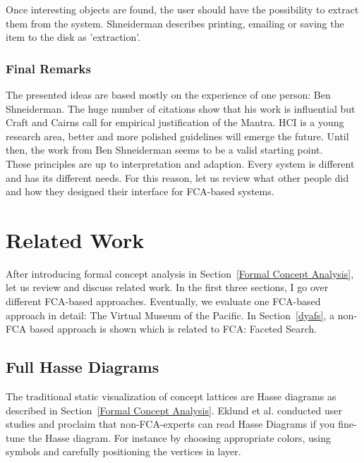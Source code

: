\documentclass[11pt]{report}
\begin{document}
Once interesting objects are found, the user should have the possibility to extract them from the system. Shneiderman describes printing, emailing or saving the item to the disk as 'extraction'.

\subsection{Final Remarks}

The presented ideas are based mostly on the experience of one person: Ben Shneiderman. The huge number of citations show that his work is influential but Craft and Cairns \cite{Craft2005} call for empirical justification of the Mantra. HCI is a young research area, better and more polished guidelines will emerge the future. Until then, the work from Ben Shneiderman seems to be a valid starting point. \\

These principles are up to interpretation and adaption. Every system is different and has its different needs. For this reason, let us review what other people did and how they designed their interface for FCA-based systems.

\chapter{Related Work}
\label{Related Work}

After introducing formal concept analysis in Section~\ref{Formal Concept Analysis}, let us review and discuss related work. In the first three sections, I go over different FCA-based approaches. Eventually, we evaluate one FCA-based approach in detail: The Virtual Museum of the Pacific. In Section~\ref{dyafs}, a non-FCA based approach is shown which is related to FCA: Faceted Search. \\

\section{Full Hasse Diagrams}

The traditional static visualization of concept lattices are Hasse diagrams as described in Section~\ref{Formal Concept Analysis}. Eklund et al. \cite{Eklund2004} conducted user studies and proclaim that non-FCA-experts can read Hasse Diagrams if you fine-tune the Hasse diagram. For instance by choosing appropriate colors, using symbols and carefully positioning the vertices in layer. \\
\end{document}
